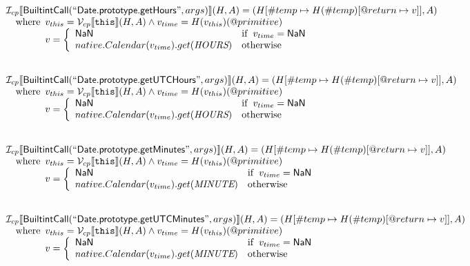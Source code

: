 \documentclass{article}
\newcommand{\SF}[1]{\mbox{\textsf{#1}}}
\newcommand{\TT}[1]{\mbox{\texttt{#1}}}
\newcommand{\wherec}[1]{{\rm where}\begin{array}[t]{l}#1\end{array}}
\newcommand{\ifc}[1]{{\rm if}\begin{array}[t]{l}#1\end{array}}
\newcommand{\owc}{{\rm otherwise}}
\newcommand{\I}{\mathcal{I}}
\newcommand{\V}{\mathcal{V}}
\newcommand{\lbr}{\llbracket}
\newcommand{\rbr}{\rrbracket}
\begin{document}
\[\begin{array}{l}
\I _{cp}\lbr \SF{BuiltintCall}(``\SF{Date.prototype.getHours}",args)\rbr(H,A)
  = (H[\#temp \mapsto H(\#temp)[@return \mapsto v]], A)\\
\quad\wherec{
  v_{this} = \V _{cp}\lbr \TT{this}\rbr (H,A) \land v_{time} = H(v_{this})(@primitive)\\
  v = \left\{\begin{array}{ll}
    \SF{NaN}  & \ifc{v_{time} = \SF{NaN}}\\
    native.Calendar(v_{time}).get(\emph{HOURS}) & \owc
    \end{array}\right.
  }\\
\\\\

\I _{cp}\lbr \SF{BuiltintCall}(``\SF{Date.prototype.getUTCHours}",args)\rbr(H,A)
  = (H[\#temp \mapsto H(\#temp)[@return \mapsto v]], A)\\
\quad\wherec{
  v_{this} = \V _{cp}\lbr \TT{this}\rbr (H,A) \land v_{time} = H(v_{this})(@primitive)\\
  v = \left\{\begin{array}{ll}
    \SF{NaN}  & \ifc{v_{time} = \SF{NaN}}\\
    native.Calendar(v_{time}).get(\emph{HOURS}) & \owc
    \end{array}\right.
  }\\
\\\\

\I _{cp}\lbr \SF{BuiltintCall}(``\SF{Date.prototype.getMinutes}",args)\rbr(H,A)
  = (H[\#temp \mapsto H(\#temp)[@return \mapsto v]], A)\\
\quad\wherec{
  v_{this} = \V _{cp}\lbr \TT{this}\rbr (H,A) \land v_{time} = H(v_{this})(@primitive)\\
  v = \left\{\begin{array}{ll}
    \SF{NaN}  & \ifc{v_{time} = \SF{NaN}}\\
    native.Calendar(v_{time}).get(\emph{MINUTE}) & \owc
    \end{array}\right.
  }\\
\\\\

\I _{cp}\lbr \SF{BuiltintCall}(``\SF{Date.prototype.getUTCMinutes}",args)\rbr(H,A)
  = (H[\#temp \mapsto H(\#temp)[@return \mapsto v]], A)\\
\quad\wherec{
  v_{this} = \V _{cp}\lbr \TT{this}\rbr (H,A) \land v_{time} = H(v_{this})(@primitive)\\
  v = \left\{\begin{array}{ll}
    \SF{NaN}  & \ifc{v_{time} = \SF{NaN}}\\
    native.Calendar(v_{time}).get(\emph{MINUTE}) & \owc
    \end{array}\right.
  }\\
\\\\

\end{array}
\]
\end{document}
